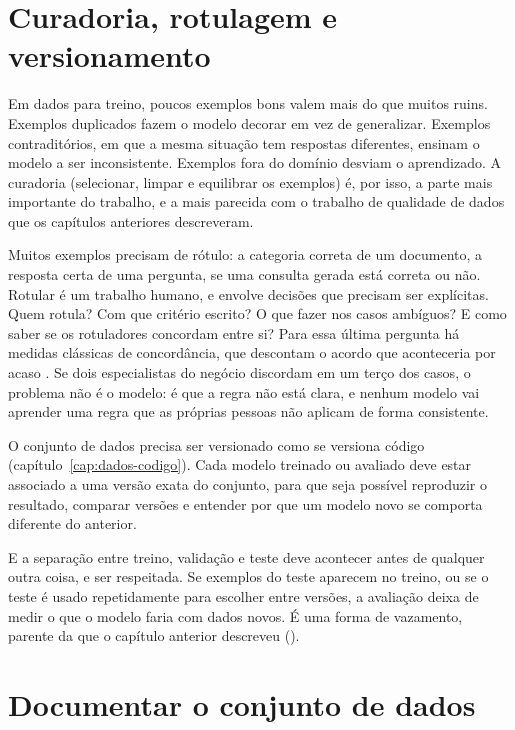 \section{Curadoria, rotulagem e versionamento}
\label{sec:curadoria}

Em dados para treino, poucos exemplos bons valem mais do que muitos ruins. Exemplos
duplicados fazem o modelo decorar em vez de generalizar. Exemplos contraditórios, em que a
mesma situação tem respostas diferentes, ensinam o modelo a ser inconsistente. Exemplos fora
do domínio desviam o aprendizado. A curadoria (selecionar, limpar e equilibrar os exemplos)
é, por isso, a parte mais importante do trabalho, e a mais parecida com o trabalho de
qualidade de dados que os capítulos anteriores descreveram.

Muitos exemplos precisam de rótulo: a categoria correta de um documento, a resposta certa de
uma pergunta, se uma consulta gerada está correta ou não. Rotular é um trabalho humano, e
envolve decisões que precisam ser explícitas. Quem rotula? Com que critério escrito? O que
fazer nos casos ambíguos? E como saber se os rotuladores concordam entre si? Para essa
última pergunta há medidas clássicas de concordância, que descontam o acordo que
aconteceria por acaso \parencite{cohen1960}. Se dois especialistas do negócio discordam em
um terço dos casos, o problema não é o modelo: é que a regra não está clara, e nenhum
modelo vai aprender uma regra que as próprias pessoas não aplicam de forma consistente.

O conjunto de dados precisa ser versionado como se versiona código (capítulo~\ref{cap:dados-codigo}).
Cada modelo treinado ou avaliado deve estar associado a uma versão exata do conjunto, para
que seja possível reproduzir o resultado, comparar versões e entender por que um modelo novo
se comporta diferente do anterior.

E a separação entre treino, validação e teste deve acontecer antes de qualquer outra coisa,
e ser respeitada. Se exemplos do teste aparecem no treino, ou se o teste é usado
repetidamente para escolher entre versões, a avaliação deixa de medir o que o modelo faria
com dados novos. É uma forma de vazamento, parente da que o capítulo anterior descreveu
().

\section{Documentar o conjunto de dados}
\label{sec:datasheets}

